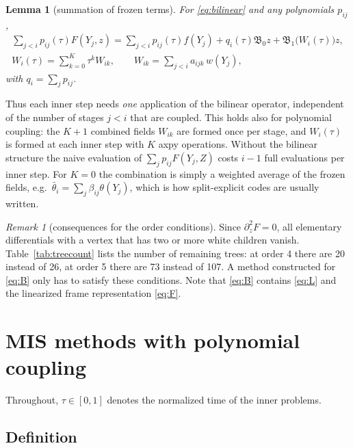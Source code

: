 \documentclass[11pt,a4paper]{article}
\newtheorem{lemma}[theorem]{Lemma}
\theoremstyle{definition}
\theoremstyle{remark}
\newtheorem{remark}[theorem]{Remark}
\begin{document}
\begin{lemma}[summation of frozen terms]\label{lem:summation}
For \eqref{eq:bilinear} and any polynomials $p_{ij}$,
\begin{gather*}
 \sum_{j<i}p_{ij}(\tau)F(Y_j,z)
 =\sum_{j<i}p_{ij}(\tau)f(Y_j)+q_i(\tau)\mathfrak B_0z
  +\mathfrak B_1\big(W_i(\tau)\big)z,\\
 W_i(\tau)=\sum_{k=0}^{K}\tau^kW_{ik},\qquad W_{ik}=\sum_{j<i}a_{ijk}\,w(Y_j),
\end{gather*}
with $q_i=\sum_jp_{ij}$.
\end{lemma}

Thus each inner step needs \emph{one} application of the bilinear
operator, independent of the number of stages $j<i$ that are coupled.
This holds also for polynomial coupling: the $K+1$ combined fields
$W_{ik}$ are formed once per stage, and $W_i(\tau)$ is formed at each
inner step with $K$ axpy operations. Without the bilinear structure the
naive evaluation of $\sum_jp_{ij}F(Y_j,Z)$ costs $i-1$ full evaluations
per inner step. For $K=0$ the combination is simply a weighted average
of the frozen fields, e.g.\
$\bar\theta_i=\sum_j\beta_{ij}\theta(Y_j)$, which is how split-explicit
codes are usually written.

\begin{remark}[consequences for the order conditions]
Since $\partial_z^2F=0$, all elementary differentials with a vertex that
has two or more white children vanish. Table~\ref{tab:treecount} lists
the number of remaining trees: at order 4 there are 20 instead of 26, at
order 5 there are 73 instead of 107. A method constructed for
\eqref{eq:B} only has to satisfy these conditions. Note that
\eqref{eq:B} contains \eqref{eq:L} and the linearized frame
representation \eqref{eq:F}.
\end{remark}

\section{MIS methods with polynomial coupling}
\label{sec:methods}

Throughout, $\tau\in[0,1]$ denotes the normalized time of the inner
problems.

\subsection{Definition}
\end{document}
